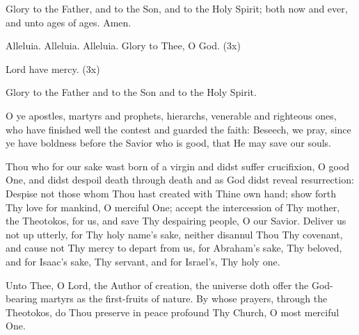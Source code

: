 {\begin{maybetwocolumns}




\end{maybetwocolumns}

\begin{reader}
  \item Glory to the Father, and to the Son, and to the Holy Spirit;
    both now and ever, and unto ages of ages. Amen.
  \item Alleluia. Alleluia. Alleluia. Glory to Thee, O God. (3x)
  \item Lord have mercy. (3x)
  \item Glory to the Father and to the Son and to the Holy Spirit.
\end{reader}

\begin{maybetwocolumns}
O ye apostles, martyrs and prophets, hierarchs,
venerable and righteous ones, who have 
finished well the contest and guarded the faith:
Beseech, we pray, since ye have boldness 
before the Savior who is good, that He may save our souls.
 

Thou who for our sake wast born of a virgin and didst suffer crucifixion,
O good One, 
and didst despoil death through death and as God didst reveal resurrection:
Despise not those whom Thou hast created with Thine own hand;
show forth Thy love for mankind,
O merciful One; accept the intercession of Thy mother, the Theotokos,
for us, and save Thy despairing people, O our Savior.
Deliver us not up utterly, for Thy holy name’s sake,
neither disannul Thou Thy covenant, 
and cause not Thy mercy to depart from us,
for Abraham’s sake, Thy beloved,
and for Isaac’s sake, Thy servant,
and for Israel’s, Thy holy one.
\end{maybetwocolumns}




\begin{maybetwocolumns}


Unto Thee, O Lord, the Author of creation, the universe doth offer the God-bearing 
martyrs as the first-fruits of nature. By whose prayers, through the Theotokos, do Thou 
preserve in peace profound Thy Church, O most merciful One. 


\end{maybetwocolumns}}
